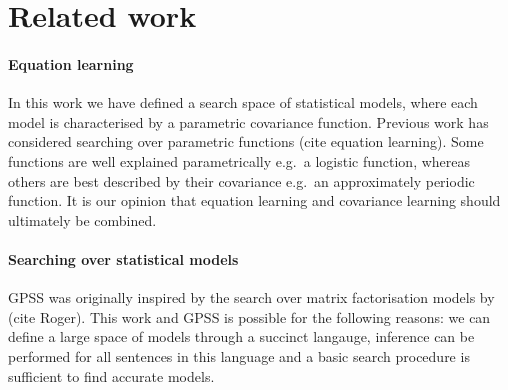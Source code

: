 \documentclass{article}
\def\eg{e.g.\ }
\begin{document}


\section{Related work}

\paragraph{Equation learning}

In this work we have defined a search space of statistical models, where each model is characterised by a parametric covariance function.
Previous work has considered searching over parametric functions (cite equation learning).
Some functions are well explained parametrically \eg a logistic function, whereas others are best described by their covariance \eg an approximately periodic function.
It is our opinion that equation learning and covariance learning should ultimately be combined.

\paragraph{Searching over statistical models}

GPSS was originally inspired by the search over matrix factorisation models by (cite Roger).
This work and GPSS is possible for the following reasons: we can define a large space of models through a succinct langauge, inference can be performed for all sentences in this language and a basic search procedure is sufficient to find accurate models.
\end{document}

